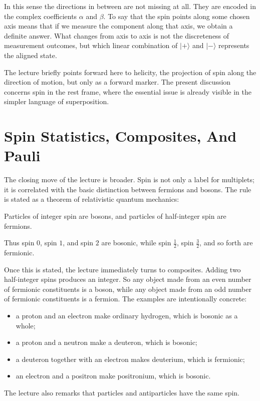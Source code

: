 In this sense the directions in between are not missing at all. They are encoded in the complex coefficients \(\alpha\) and \(\beta\). To say that the spin points along some chosen axis means that if we measure the component along that axis, we obtain a definite answer. What changes from axis to axis is not the discreteness of measurement outcomes, but which linear combination of \(\lvert+\rangle\) and \(\lvert-\rangle\) represents the aligned state.

The lecture briefly points forward here to helicity, the projection of spin along the direction of motion, but only as a forward marker. The present discussion concerns spin in the rest frame, where the essential issue is already visible in the simpler language of superposition.

\section{Spin Statistics, Composites, And Pauli}

The closing move of the lecture is broader. Spin is not only a label for multiplets; it is correlated with the basic distinction between fermions and bosons. The rule is stated as a theorem of relativistic quantum mechanics:
\begin{theorem}
Particles of integer spin are bosons, and particles of half-integer spin are fermions.
\end{theorem}
Thus spin \(0\), spin \(1\), and spin \(2\) are bosonic, while spin \(\tfrac12\), spin \(\tfrac32\), and so forth are fermionic.

Once this is stated, the lecture immediately turns to composites. Adding two half-integer spins produces an integer. So any object made from an even number of fermionic constituents is a boson, while any object made from an odd number of fermionic constituents is a fermion. The examples are intentionally concrete:
\begin{itemize}
\item a proton and an electron make ordinary hydrogen, which is bosonic as a whole;
\item a proton and a neutron make a deuteron, which is bosonic;
\item a deuteron together with an electron makes deuterium, which is fermionic;
\item an electron and a positron make positronium, which is bosonic.
\end{itemize}
The lecture also remarks that particles and antiparticles have the same spin.

